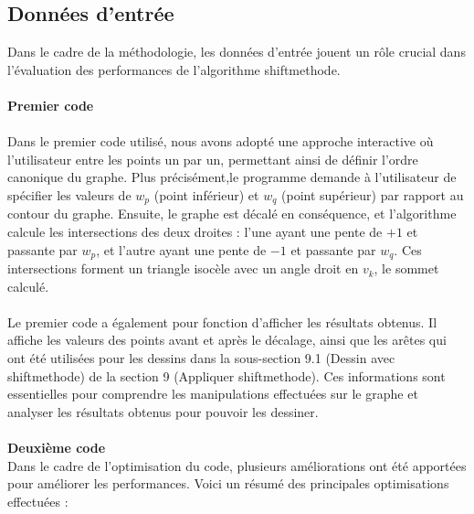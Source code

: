 \documentclass[hidelinks,letterpaper,12pt]{article}
\begin{document}
\subsection{Données d'entrée}
Dans le cadre de la méthodologie, les données d'entrée jouent un rôle crucial dans l'évaluation des performances de l'algorithme shiftmethode. 
\\ \\
\textbf{Premier code}
\\ \\
Dans le premier code utilisé, nous avons adopté une approche interactive où l'utilisateur entre les points un par un, permettant ainsi de définir l'ordre canonique du graphe. Plus précisément,le programme demande à l'utilisateur de spécifier les valeurs de \(w_p\) (point inférieur) et \(w_q\) (point supérieur) par rapport au contour du graphe. Ensuite, le graphe est décalé en conséquence, et l'algorithme calcule les intersections des deux droites : l'une ayant une pente de \(+1\) et passante par \(w_p\), et l'autre ayant une pente de \(-1\) et passante par \(w_q\). Ces intersections forment un triangle isocèle avec un angle droit en \(v_k\), le sommet calculé. 
\\ \\
Le premier code a également pour fonction d'afficher les résultats obtenus. Il affiche les valeurs des points avant et après le décalage, ainsi que les arêtes qui ont été utilisées pour les dessins dans la sous-section 9.1 (Dessin avec shiftmethode) de la section 9 (Appliquer shiftmethode). Ces informations sont essentielles pour comprendre les manipulations effectuées sur le graphe et analyser les résultats obtenus pour pouvoir les dessiner.
\\ \\
\textbf{Deuxième code}
\\ 
Dans le cadre de l'optimisation du code, plusieurs améliorations ont été apportées pour améliorer les performances. Voici un résumé des principales optimisations effectuées :
\end{document}
